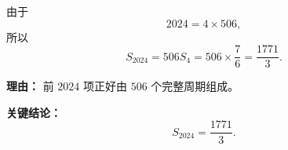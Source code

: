 \begin{examplebox}
\begin{description}[style=nextline, leftmargin=2.8em, labelsep=0.5em, itemsep=0.45em]
		\item[\textbf{第四步（转化长求和）：}]
		      由于
		      \[
			      2024=4\times506,
		      \]
		      所以
		      \[
			      S_{2024}=506S_4=506\times\frac76=\frac{1771}{3}.
		      \]
		      \par\textbf{理由：} 前 \(2024\) 项正好由 \(506\) 个完整周期组成。
	\end{description}

	\textbf{\textcolor{CExample}{关键结论：}}
	\[
		\boxed{S_{2024}=\frac{1771}{3}}.
	\]
\end{examplebox}